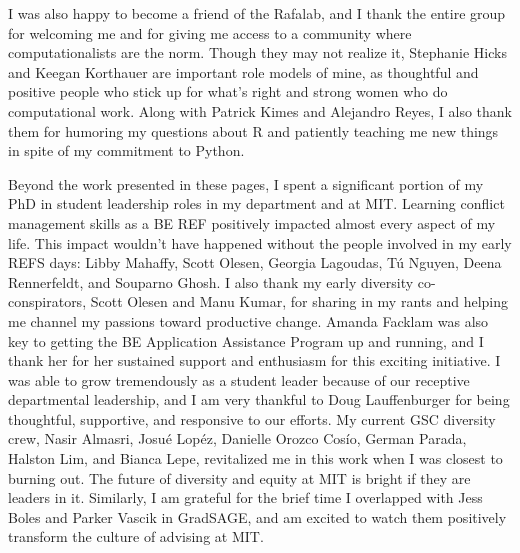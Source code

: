\begin{singlespace}
I was also happy to become a friend of the Rafalab, and I thank the entire group for welcoming me and for giving me access to a community where computationalists are the norm.
Though they may not realize it, Stephanie Hicks and Keegan Korthauer are important role models of mine, as thoughtful and positive people who stick up for what's right and strong women who do computational work.
Along with Patrick Kimes and Alejandro Reyes, I also thank them for humoring my questions about R and patiently teaching me new things in spite of my commitment to Python.

Beyond the work presented in these pages, I spent a significant portion of my PhD in student leadership roles in my department and at MIT.
Learning conflict management skills as a BE REF positively impacted almost every aspect of my life.
This impact wouldn't have happened without the people involved in my early REFS days: Libby Mahaffy, Scott Olesen, Georgia Lagoudas, T\'{u} Nguyen, Deena Rennerfeldt, and Souparno Ghosh.
I also thank my early diversity co-conspirators, Scott Olesen and Manu Kumar, for sharing in my rants and helping me channel my passions toward productive change.
Amanda Facklam was also key to getting the BE Application Assistance Program up and running, and I thank her for her sustained support and enthusiasm for this exciting initiative.
I was able to grow tremendously as a student leader because of our receptive departmental leadership, and I am very thankful to Doug Lauffenburger for being thoughtful, supportive, and responsive to our efforts.
My current GSC diversity crew, Nasir Almasri, Josu\'{e} Lop\'{e}z, Danielle Orozco Cos\'{i}o, German Parada, Halston Lim, and Bianca Lepe, revitalized me in this work when I was closest to burning out.
The future of diversity and equity at MIT is bright if they are leaders in it.
Similarly, I am grateful for the brief time I overlapped with Jess Boles and Parker Vascik in GradSAGE, and am excited to watch them positively transform the culture of advising at MIT.


\end{singlespace}

